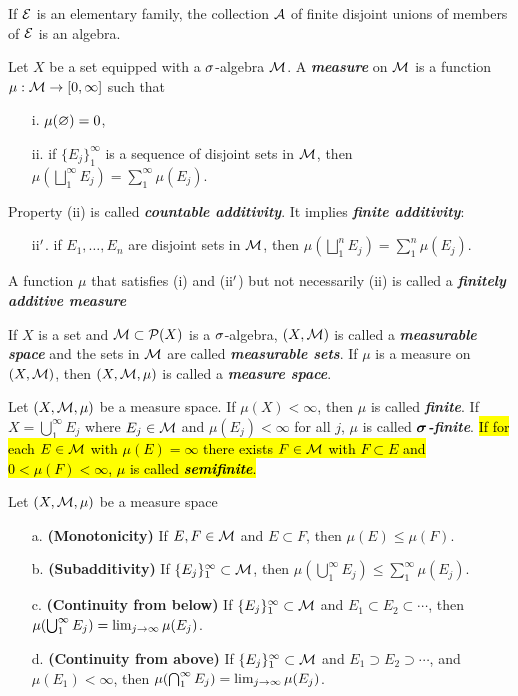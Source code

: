 \begin{prop}
If $\mathcal{E}$ is an elementary family, the collection $\mathcal{A}$ of finite disjoint unions of members of $\mathcal{E}$ is an algebra.
\end{prop}

\vs 
\dfn Let $X$ be a set equipped with a $\sigma$-algebra $\mathcal{M}$. A \textbf{\textit{measure}} on $\mathcal{M}$ is a function $\mu:\mathcal{M}\rightarrow [0,\infty]$ such that 
\begin{enumerate}
\item[i.] $\mu(\varnothing) = 0$,
\item[ii.] if $\{E_j\}_1^\infty$ is a sequence of disjoint sets in $\mathcal{M}$, then $\mu(\bigsqcup_1^\infty E_j) = \sum_1^\infty \mu(E_j)$.
\end{enumerate}
Property (ii) is called \textbf{\textit{countable additivity}}. It implies \textbf{\textit{finite additivity}}:
\begin{enumerate}
\item[ii$^\prime$.] if $E_1,\ldots,E_n$ are disjoint sets in $\mathcal{M}$, then $\mu(\bigsqcup_1^nE_j) = \sum_1^n\mu(E_j)$.
\end{enumerate}
A function $\mu$ that satisfies (i) and (ii$^\prime$) but not necessarily (ii) is called a \textbf{\textit{finitely additive measure}}

\dfn If $X$ is a set and $\mathcal{M}\subset \mathcal{P}(X)$ is a $\sigma$-algebra, $(X,\mathcal{M})$ is called a \textbf{\textit{measurable space}} and the sets in $\mathcal{M}$ are called \textbf{\textit{measurable sets}}. If $\mu$ is a measure on $(X,\mathcal{M})$, then $(X, \mathcal{M}, \mu)$ is called a \textbf{\textit{measure space}}.


\dfn Let $(X, \mathcal{M}, \mu)$ be a measure space. If $\mu(X) < \infty$, then $\mu$ is called \textbf{\textit{finite}}. If $X = \bigcup_1^\infty E_j$ where $E_j\in \mathcal{M}$ and $\mu(E_j) < \infty$ for all $j$, $\mu$ is called \textbf{\textit{$\boldsymbol{\sigma}$-finite}}. \hl{If for each $E\in \mathcal{M}$ with $\mu(E) = \infty$ there exists $F\in \mathcal{M}$ with $F\subset E$ and $0 < \mu(F) < \infty$, $\mu$ is called \textbf{\textit{semifinite}}.}\\

\begin{thm}
Let $(X, \mathcal{M}, \mu)$ be a measure space
\begin{enumerate}
\item[a.] \textbf{(Monotonicity)} If $E, F \in \mathcal{M}$ and $E\subset F$, then $\mu(E)\leq \mu(F)$.
\item[b.] \textbf{(Subadditivity)} If $\{E_j\}_1^\infty \subset \mathcal{M}$, then $\mu(\bigcup_1^\infty E_j) \leq \sum_1^\infty \mu(E_j)$.
\item[c.]  \textbf{(Continuity from below)} If $\{E_j\}_1^\infty \subset \mathcal{M}$ and $E_1\subset E_2\subset \cdots$, then $\mu(\bigcup_1^\infty E_j) = \lim_{j\rightarrow \infty}\mu(E_j)$.
\item[d.]  \textbf{(Continuity from above)} If $\{E_j\}_1^\infty \subset \mathcal{M}$ and $E_1\supset E_2\supset \cdots$, and $\mu(E_1) < \infty$, then $\mu(\bigcap_1^\infty E_j) = \lim_{j\rightarrow \infty}\mu(E_j)$.
\end{enumerate}
\end{thm}

